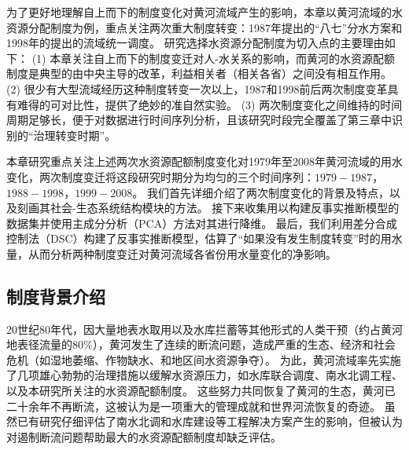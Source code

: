 

为了更好地理解自上而下的制度变化对黄河流域产生的影响，本章以黄河流域的水资源分配制度为例，重点关注两次重大制度转变：1987年提出的“八七”分水方案和1998年的提出的流域统一调度。
研究选择水资源分配制度为切入点的主要理由如下：
(1) 本章关注自上而下的制度变迁对人-水关系的影响，而黄河的水资源配额制度是典型的由中央主导的改革，利益相关者（相关各省）之间没有相互作用。
(2) 很少有大型流域经历这种制度转变一次以上，1987和1998前后两次制度变革具有难得的可对比性，提供了绝妙的准自然实验。
(3) 两次制度变化之间维持的时间周期足够长，便于对数据进行时间序列分析，且该研究时段完全覆盖了第三章中识别的“治理转变时期”。

本章研究重点关注上述两次水资源配额制度变化对1979年至2008年黄河流域的用水变化，两次制度变迁将这段研究时期分为均匀的三个时间序列：$1979-1987$，$1988-1998$，$1999-2008$。
我们首先详细介绍了两次制度变化的背景及特点，以及刻画其社会-生态系统结构模块的方法。
接下来收集用以构建反事实推断模型的数据集并使用主成分分析（PCA）方法对其进行降维。
最后，我们利用差分合成控制法（DSC）构建了反事实推断模型\cite{arkhangelsky2021}，估算了“如果没有发生制度转变”时的用水量，从而分析两种制度变迁对黄河流域各省份用水量变化的净影响。

\subsection{制度背景介绍}\label{sec:yrb}

20世纪80年代，因大量地表水取用以及水库拦蓄等其他形式的人类干预（约占黄河地表径流量的$80\%$），黄河发生了连续的断流问题，造成严重的生态、经济和社会危机（如湿地萎缩、作物缺水、和地区间水资源争夺）。
为此，黄河流域率先实施了几项雄心勃勃的治理措施以缓解水资源压力，如水库联合调度、南水北调工程、以及本研究所关注的水资源配额制度\cite{long2020, wang2019d}。
这些努力共同恢复了黄河的生态，黄河已二十余年不再断流，这被认为是一项重大的管理成就和世界河流恢复的奇迹。
虽然已有研究仔细评估了南水北调和水库建设等工程解决方案产生的影响\cite{long2020,wang2019c}，但被认为对遏制断流问题帮助最大的水资源配额制度却缺乏评估\cite{wang2019b}。

